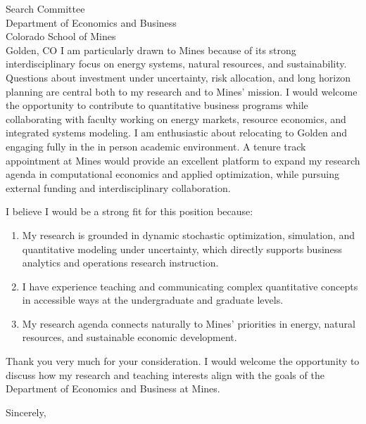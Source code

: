 \documentclass[11pt,letterpaper]{letter}
\begin{document}
\begin{letter}{
Search Committee \\
Department of Economics and Business \\
Colorado School of Mines \\
Golden, CO
}
I am particularly drawn to Mines because of its strong interdisciplinary focus on energy systems, natural resources, and sustainability. Questions about investment under uncertainty, risk allocation, and long horizon planning are central both to my research and to Mines’ mission. I would welcome the opportunity to contribute to quantitative business programs while collaborating with faculty working on energy markets, resource economics, and integrated systems modeling. I am enthusiastic about relocating to Golden and engaging fully in the in person academic environment. A tenure track appointment at Mines would provide an excellent platform to expand my research agenda in computational economics and applied optimization, while pursuing external funding and interdisciplinary collaboration.

I believe I would be a strong fit for this position because:
\begin{enumerate}
    \item My research is grounded in dynamic stochastic optimization, simulation, and quantitative modeling under uncertainty, which directly supports business analytics and operations research instruction.
    \item I have experience teaching and communicating complex quantitative concepts in accessible ways at the undergraduate and graduate levels.
    \item My research agenda connects naturally to Mines’ priorities in energy, natural resources, and sustainable economic development.
\end{enumerate}

Thank you very much for your consideration. I would welcome the opportunity to discuss how my research and teaching interests align with the goals of the Department of Economics and Business at Mines.

\closing{Sincerely,}

\end{letter}
\end{document}
